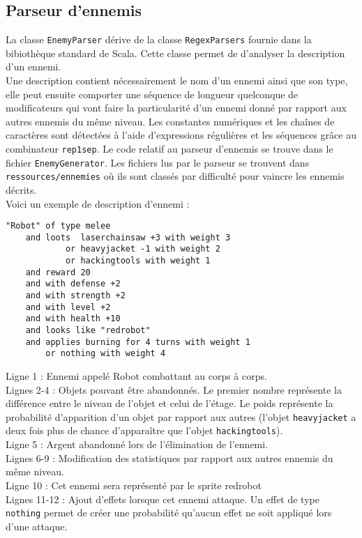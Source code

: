 \documentclass[10pt,a4paper]{article}
\begin{document}
\subsection{Parseur d'ennemis}
La classe \texttt{EnemyParser} dérive de la classe \texttt{RegexParsers} fournie dans la bibiothèque standard de Scala. Cette classe permet de d'analyser la description d'un ennemi.\\
Une description contient nécessairement le nom d'un ennemi ainsi que son type, elle peut ensuite comporter une séquence de longueur quelconque de modificateurs qui vont faire la particularité d'un ennemi donné par rapport aux autres ennemis du même niveau. Les constantes numériques et les chaînes de caractères sont détectées à l'aide d'expressions régulières et les séquences grâce au combinateur \texttt{rep1sep}. Le code relatif au parseur d'ennemis se trouve dans le fichier \texttt{EnemyGenerator}. Les fichiers lus par le parseur se trouvent dans \texttt{ressources/ennemies} où ils sont classés par difficulté pour vaincre les ennemis décrits.\\
Voici un exemple de description d'ennemi :
\begin{Verbatim}
"Robot" of type melee
    and loots  laserchainsaw +3 with weight 3
            or heavyjacket -1 with weight 2
            or hackingtools with weight 1       
    and reward 20                            
    and with defense +2
    and with strength +2
    and with level +2
    and with health +10
    and looks like "redrobot"
    and applies burning for 4 turns with weight 1
        or nothing with weight 4                 
\end{Verbatim}
Ligne 1 : Ennemi appelé Robot combattant au corps à corps.\\
Lignes 2-4 : Objets pouvant être abandonnés. Le premier nombre représente la différence entre le niveau de l'objet et celui de l'étage. Le poids représente la probabilité d'apparition d'un objet par rapport aux autres (l'objet \texttt{heavyjacket} a deux fois plus de chance d'apparaître que l'objet \texttt{hackingtools}).\\
Ligne 5 : Argent abandonné lors de l'élimination de l'ennemi.
\\Lignes 6-9 : Modification des statistiques par rapport aux autres ennemis du même niveau.
\\Ligne 10 : Cet ennemi sera représenté par le sprite redrobot
\\Lignes 11-12 : Ajout d'effets lorsque cet ennemi attaque. Un effet de type \texttt{nothing} permet de créer une probabilité qu'aucun effet ne soit appliqué lors d'une attaque.
\end{document}
